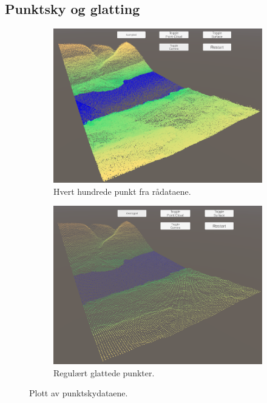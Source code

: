 \documentclass[norsk, doc, 11pt, a4paper]{apa7}  %
\begin{document}
\subsection{Punktsky og glatting} \label{fig:punkt}
\begin{figure}[H]
	\centering
	\begin{subfigure}{.5\textwidth}
		\centering
		\includegraphics[width=.9\linewidth]{figs/punktSample.png}
		\caption{Hvert hundrede punkt fra rådataene.}
	\end{subfigure}%
	\begin{subfigure}{.5\textwidth}
		\centering
		\includegraphics[width=.9\linewidth]{figs/punktMean.png}
		\caption{Regulært glattede punkter.}
	\end{subfigure}
	\caption{Plott av punktskydataene.}
\end{figure}
\end{document}
